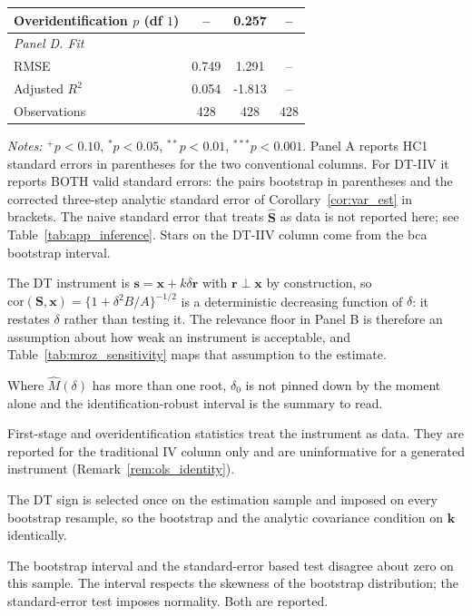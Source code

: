 \begin{table}[htbp]
\begin{threeparttable}
\begin{tabular}{lccc}
\quad Overidentification $p$ (df $1$) & -- & 0.257 & -- \\[3pt]
\midrule
\multicolumn{4}{l}{\emph{Panel D. Fit}} \\
\quad RMSE & 0.749 & 1.291 & -- \\
\quad Adjusted $R^2$ & 0.054 & -1.813 & -- \\
\quad Observations & 428 & 428 & 428 \\
\bottomrule
\end{tabular}
\begin{tablenotes}
\small
\item \textit{Notes:} $^{+}p<0.10$, $^{*}p<0.05$, $^{**}p<0.01$,
$^{***}p<0.001$. Panel A reports HC1 standard errors in parentheses for
the two conventional columns. For DT-IIV it reports BOTH valid standard
errors: the pairs bootstrap in parentheses and the corrected three-step
analytic standard error of Corollary~\ref{cor:var_est} in brackets. The
naive standard error that treats $\widehat{\mathbf S}$ as data is not
reported here; see Table~\ref{tab:app_inference}. Stars on the DT-IIV
column come from the bca bootstrap interval.
\item The DT instrument is $\mathbf s=\mathbf x+k\delta\mathbf r$ with
$\mathbf r\perp\mathbf x$ by construction, so
$\mathrm{cor}(\mathbf S,\mathbf x)=\{1+\delta^2 B/A\}^{-1/2}$ is a
deterministic decreasing function of $\delta$: it restates $\delta$ rather
than testing it. The relevance floor in Panel B is therefore an
assumption about how weak an instrument is acceptable, and
Table~\ref{tab:mroz_sensitivity} maps that assumption to the estimate.
\item Where $\widehat M(\delta)$ has more than one root, $\delta_0$ is
not pinned down by the moment alone and the identification-robust
interval is the summary to read.
\item First-stage and overidentification statistics treat the instrument
as data. They are reported for the traditional IV column only and are
uninformative for a generated instrument
(Remark~\ref{rem:ols_identity}).
\item The DT sign is selected once on the estimation sample and imposed on
every bootstrap resample, so the bootstrap and the analytic covariance
condition on $\mathbf k$ identically.
\item The bootstrap interval and the standard-error based test
disagree about zero on this sample. The interval respects the skewness
of the bootstrap distribution; the standard-error test imposes
normality. Both are reported.
\end{tablenotes}
\end{threeparttable}
\end{table}
